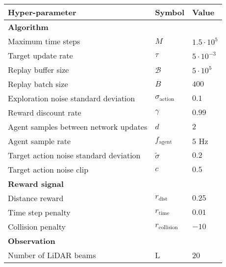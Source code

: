 
\begin{table}[htb!]
\centering
\small
\begin{tabularx}{0.7\textwidth}{RCL} 
    \hline
    \textbf{Hyper-parameter} & \textbf{Symbol} & \textbf{Value} \\ 
    \hline
    \textbf{Algorithm}                      &                           & \\
    Maximum time steps                      & $M$                       & $1.5 \cdot 10^5$   \\
    Target update rate                      & $\tau$                    & $5\cdot10^{-3}$ \\
    Replay buffer size                      & $\mathcal{B}$             & $5\cdot 10^5$ \\
    Replay batch size                       & $B$                       & $400$ \\
    Exploration noise standard deviation    & $\sigma_{\text{action}}$  & $0.1$ \\
    Reward discount rate                    & $\gamma$                  & $0.99$ \\
    Agent samples between network updates   & $d$                       & $2$ \\
    Agent sample rate                       & $f_{\text{agent}}$        & $5$ Hz \\
    Target action noise standard deviation  & $\tilde{\sigma}$          & $0.2$ \\ 
    Target action noise clip                & $c$                       & $0.5$ \\
    \textbf{Reward signal}                  &                           & \\
    Distance reward                         & $r_{\text{dist}}$         & $0.25$ \\ 
    Time step penalty                       & $r_{\text{time}}$         & $0.01$ \\
    Collision penalty                       & $r_{\text{collision}}$    & $-10$ \\
    \textbf{Observation}                    &                           & \\
    Number of LiDAR beams                   & L                         & 20 \\

\end{tabularx}
\end{table}
